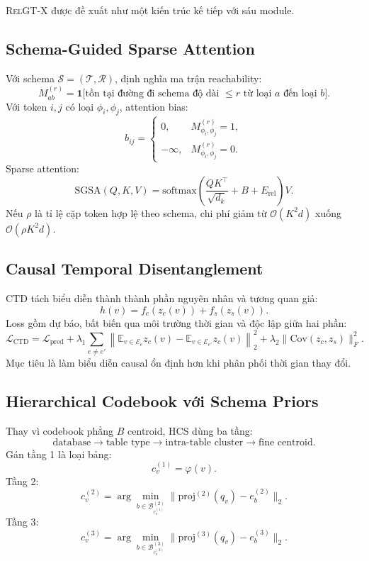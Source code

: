 \documentclass[12pt,a4paper]{article}
\newcommand{\RelGTx}{\textsc{RelGT-X}}
\begin{document}
\RelGTx{} được đề xuất như một kiến trúc kế tiếp với sáu module.

\subsection{Schema-Guided Sparse Attention}

Với schema $\mathcal{S}=(\mathcal{T},\mathcal{R})$, định nghĩa ma trận reachability:
\[
  M_{ab}^{(r)}=
  \mathbf{1}\bigl[\text{tồn tại đường đi schema độ dài }\le r
  \text{ từ loại }a\text{ đến loại }b\bigr].
\]
Với token $i,j$ có loại $\phi_i,\phi_j$, attention bias:
\[
  b_{ij}=
  \begin{cases}
    0,& M_{\phi_i,\phi_j}^{(r)}=1,\\
    -\infty,& M_{\phi_i,\phi_j}^{(r)}=0.
  \end{cases}
\]
Sparse attention:
\[
  \text{SGSA}(Q,K,V)=
  \text{softmax}\left(\frac{QK^\top}{\sqrt{d_k}}+B+E_\text{rel}\right)V.
\]
Nếu $\rho$ là tỉ lệ cặp token hợp lệ theo schema, chi phí giảm từ
$\mathcal{O}(K^2d)$ xuống $\mathcal{O}(\rho K^2d)$.

\subsection{Causal Temporal Disentanglement}

CTD tách biểu diễn thành thành phần nguyên nhân và tương quan giả:
\[
  h(v)=f_c(z_c(v))+f_s(z_s(v)).
\]
Loss gồm dự báo, bất biến qua môi trường thời gian và độc lập giữa hai phần:
\[
  \mathcal{L}_\text{CTD}=
  \mathcal{L}_\text{pred}
  +\lambda_1\sum_{e\ne e'}
  \left\|\mathbb{E}_{v\in\mathcal{E}_e}z_c(v)
  -\mathbb{E}_{v\in\mathcal{E}_{e'}}z_c(v)\right\|_2^2
  +\lambda_2\|\text{Cov}(z_c,z_s)\|_F^2.
\]
Mục tiêu là làm biểu diễn causal ổn định hơn khi phân phối thời gian thay đổi.

\subsection{Hierarchical Codebook với Schema Priors}

Thay vì codebook phẳng $B$ centroid, HCS dùng ba tầng:
\[
  \text{database}\rightarrow \text{table type}
  \rightarrow \text{intra-table cluster}
  \rightarrow \text{fine centroid}.
\]
Gán tầng 1 là loại bảng:
\[
  c_v^{(1)}=\varphi(v).
\]
Tầng 2:
\[
  c_v^{(2)}=\arg\min_{b\in\mathcal{B}_{c_v^{(1)}}^{(2)}}
  \|\text{proj}^{(2)}(q_v)-e_b^{(2)}\|_2.
\]
Tầng 3:
\[
  c_v^{(3)}=\arg\min_{b\in\mathcal{B}_{c_v^{(2)}}^{(3)}}
  \|\text{proj}^{(3)}(q_v)-e_b^{(3)}\|_2.
\]
\end{document}
